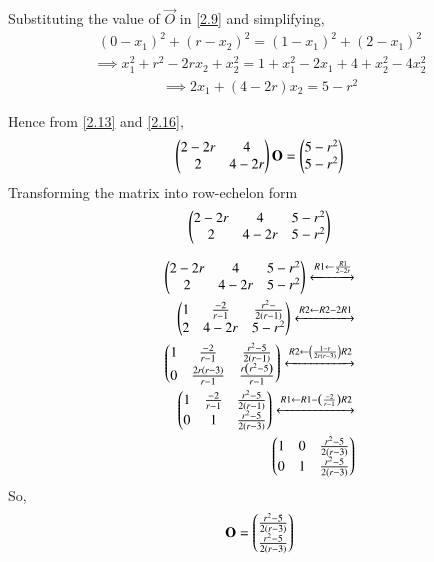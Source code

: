 \documentclass[journal,12pt,twocolumn]{IEEEtran}
\begin{document}
 Substituting the value of $\vec{O}$ in \ref{2.9} and simplifying,
\begin{multline}
\left(0 -x_1\right)^{2} +\left(r -x_2\right)^{2} = \left(1 -x_1\right)^{2} + \left(2 -x_1\right)^{2}  \label{2.14}
\end{multline}
\begin{multline}
\implies   x_{1}^{2} + r^{2} -  2rx_2 + x_{2}^{2} = 1 + x_{1}^{2} - 2x_1 + 4 + x_{2}^{2} - 4x_{2}^{2}  \label{2.15}
\end{multline}
\begin{multline}
\implies   2x_1  + \left(4 - 2r\right)x_2  = 5 - r^{2} \label{2.16}
\end{multline}

Hence  from \ref{2.13} and \ref{2.16},
\begin{align}
\begin{pmatrix}2 - 2r  &  4 \\   2 & 4 - 2r \\\end{pmatrix} \mathbf{O} = \begin{pmatrix}5 - r^2 \\ 5 - r^2 \\\end{pmatrix} \label{2.17}
\end{align}
Transforming the matrix into row-echelon form \\
\begin{align}
\begin{pmatrix}2 - 2r  &  4 &  5 - r^2 \\   2 & 4 - 2r &  5 - r^2 \\\end{pmatrix}  \label{2.18}
\end{align}

	\begin{align}
\myvec{
	2 - 2r & 4 & 5 - r^2 \\
	2 & 4 - 2r & 5 - r^2 \\
}
\xleftrightarrow[]{R1 \leftarrow \frac{R1}{2 - 2r} } \nonumber  \\
%
\myvec{
	1 & \frac{-2}{r-1} & \frac{r^2 - }{2\left( r - 1\right)} \\
	2 & 4 - 2r & 5 - r^2\\
}
\xleftrightarrow[]{R2 \leftarrow  R2 - 2R1 } \nonumber  \\
%
\myvec{
	1 & \frac{-2}{r - 1} & \frac{r^2 - 5}{2 \left( r - 1 \right)} \\
	0 & \frac{2r\left(r - 3 \right) }{ r - 1} & \frac{r \left(r^2 - 5 \right)}{r - 1}
}
\xleftrightarrow[]{R2 \leftarrow \left( \frac{1 - r}{ 2r \left( r - 3\right)}\right)R2 } \nonumber  \\
%	
\myvec{
	1 & \frac{-2}{r - 1} & \frac{r^2 - 5}{2 \left(r - 1\right)} \\
	0 & 1 & \frac{r^2 - 5}{2 \left(r - 3\right)}
}
\xleftrightarrow[]{R1 \leftarrow  R1 - \left( \frac{-2}{r - 1} \right)R2 } \nonumber   \\
\myvec{
	1 & 0 & \frac{r^2 - 5}{2 \left(r - 3\right)} \\
	0 & 1 & \frac{r^2 - 5}{2 \left(r - 3\right)}
}
\end{align}
So,
\begin{align}
\mathbf{O} = \begin{pmatrix} \frac{r^2 - 5}{2 \left(r - 3\right)} \\ \frac{r^2 - 5}{2 \left(r - 3\right)} \\\end{pmatrix}
\end{align}
\end{document}

